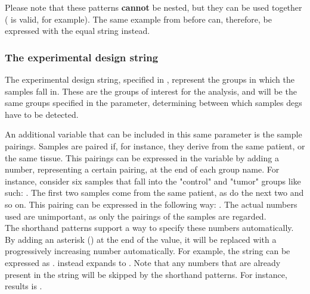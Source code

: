 Please note that these patterns \textbf{cannot} be nested, but they can be used together ( is valid, for example). The same example from before can, therefore, be expressed with the equal string  instead.

\subsubsection{The experimental design string}
The experimental design string, specified in , represent the groups in which the samples fall in. These are the groups of interest for the analysis, and will be the same groups specified in the  parameter, determining between which samples \glspl{deg} have to be detected.

An additional variable that can be included in this same parameter is the sample pairings. Samples are paired if, for instance, they derive from the same patient, or the same tissue. This pairings can be expressed in the variable by adding a number, representing a certain pairing, at the end of each group name. For instance, consider six samples that fall into the "control" and "tumor" groups like such: . The first two samples come from the same patient, as do the next two and so on. This pairing can be expressed in the following way: . The actual numbers used are unimportant, as only the pairings of the samples are regarded.\\
The shorthand patterns support a way to specify these numbers automatically. By adding an asterisk (\mono{*}) at the end of the value, it will be replaced with a progressively increasing number automatically. For example, the string  can be expressed as .  instead expands to . Note that any numbers that are already present in the string will be skipped by the shorthand patterns. For instance,  results is .


